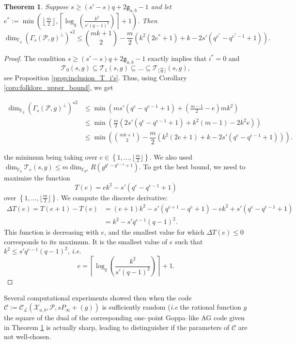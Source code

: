 \documentclass[a4paper]{article}
\newtheorem{thm}{Theorem}[section]
\theoremstyle{definition}
\theoremstyle{remark}
\newcommand{\calP}{\mathcal{P}}
\newcommand{\calL}{\mathcal{L}}
\newcommand{\calC}{\mathcal{C}}
\newcommand{\calT}{\mathcal{T}}
\newcommand{\calX}{\mathcal{X}}
\newcommand{\fqm}{\mathbb{F}_{q^m}}
\newcommand{\fq}{\mathbb{F}_{q}}
\newcommand{\set}[1]{\left\{#1\right\}}
\begin{document}
\begin{thm} \label{thm:bound_with_T_i's_inclusion}
Suppose $s \geq (s'-s)q+2\mathfrak{g}_{a,b}-1$ and let $e^* := \min\left(\left\lfloor \frac{m}{2} \right\rfloor, \left\lceil \log_q\left(\frac{k^2}{s'(q-1)^2}\right)\right\rceil+1\right)$. Then
$$\dim_{\fq} (\Gamma_s(\calP,g)^{\perp})^{\star 2}\leq \binom{mk+1}{2} - \dfrac{m}{2}(k^2(2e^*+1)+k-2s'(q^{e^*}-q^{e^*-1}+1)). $$
\end{thm}

\begin{proof}
The condition $s \geq (s'-s)q+2\mathfrak{g}_{a,b}-1$ exactly implies that $i^*=0$ and $$\calT_0(s,g) \subseteq \calT_1(s,g) \subseteq \dots \subseteq \calT_{\lfloor \frac{m}{2}\rfloor}(s,g),$$ 
see Proposition \ref{prop:inclusion_T_i's}. Thus, using Corollary \ref{coro:folklore_upper_bound}, we get

\begin{align*}
        \dim_{\fq} (\Gamma_s(\calP,g)^{\perp})^{\star 2}
        & \leq \min \left(ms'(q^e-q^{e-1}+1) + \left( \frac{m-1}{2} -e \right)mk^2 \right)\\
        & \leq \min \left(\frac{m}{2}\left(2s'(q^e-q^{e-1}+1)+k^2(m-1)-2k^2e  \right)\right) \\
        & \leq \min\left(\binom{mk+1}{2} - \dfrac{m}{2}\left(k^2(2e+1)+k-2s'(q^e-q^{e-1}+1)\right)\right).
\end{align*}

the minimum being taking over $e \in \set{1,\dots,\lfloor \frac{m}{2} \rfloor}$. We also used $\dim_{\fq}\calT_e(s,g) \leq m \dim_{\fqm} R(g^{q^e-q^{e-1}+1})$.
To get the best bound, we need to maximize the function
$$T(e) = ek^2-s'(q^e-q^{e-1}+1)$$
over $\set{1,\dots,\lfloor \frac{m}{2} \rfloor}$.
We compute the discrete derivative:
\begin{align*}
    \Delta T(e) = T(e+1)-T(e) &= (e+1)k^2- s'(q^{e+1}-q^e+1) - ek^2 + s'(q^e-q^{e-1}+1) \\
                              &= k^2 - s'q^{e-1}(q-1)^2.
\end{align*}
This function is decreasing with $e$, and the smallest value for which $\Delta T(e) \leq 0$ corresponds to its maximum. It is the smallest value of $e$ such that $k^2 \leq s'q^{e-1}(q-1)^2$, \emph{i.e.}
$$e =  \left\lceil \log_q\left(\dfrac{k^2}{s'(q-1)^2}\right)\right\rceil+1.$$
\end{proof}

\noindent Several computational experiments showed then when the code $\calC:=\calC_{\calL}(\calX_{a,b},\calP,sP_\infty+(g))$ is sufficiently random (\emph{i.e} the rational function $g$ the square of the dual of the corresponding one--point Goppa--like AG code given in Theorem \ref{thm:bound_with_T_i's_inclusion} is actually sharp, leading to  distinguisher if the parameters of $\calC$ are not well-chosen. \\
\end{document}

